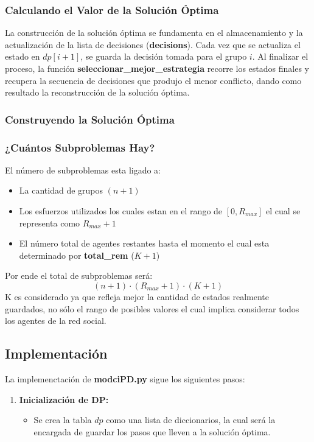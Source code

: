 \documentclass[11pt,letter]{article}
\begin{document}
\begin{itemize}
    \subsubsection{Calculando el Valor de la Solución Óptima}
    La construcción de la solución óptima se fundamenta en el almacenamiento y la actualización de la lista de decisiones (\textbf{decisions}). Cada vez que se actualiza el estado en $dp[i+1]$, se guarda la decisión tomada para el grupo $i$. Al finalizar el proceso, la función \textbf{seleccionar\_mejor\_estrategia} recorre los estados finales y recupera la secuencia de decisiones que produjo el menor conflicto, dando como resultado la reconstrucción de la solución óptima.
    \subsubsection{Construyendo la Solución Óptima}
    \subsubsection{¿Cuántos Subproblemas Hay?}
    El número de subproblemas esta ligado a:
    \begin{itemize}
    \item La cantidad de grupos $(n+1)$
    \item Los esfuerzos utilizados los cuales estan en el rango de $[0, R_{max}]$ el cual se representa como $R_{max}+1$
    \item El número total de agentes restantes hasta el momento el cual esta determinado por \textbf{total\_rem} ($K+1$)
\end{itemize}
Por ende el total de subproblemas será:
    \[
        (n+1)\cdot(R_{max}+1)\cdot(K+1)
    \]
K es considerado ya que refleja mejor la cantidad de estados realmente guardados, no sólo el rango de posibles valores el cual implica considerar todos los agentes de la red social.

    \subsection{Implementación}
    La implemenctación de \textbf{modciPD.py} sigue los siguientes pasos:
    \begin{enumerate}

    \item \textbf{Inicialización de DP:}
    \begin{itemize}
        \item Se crea la tabla $dp$ como una lista de diccionarios, la cual será la encargada de guardar los pasos que lleven a la solución óptima.


\end{itemize}
\end{enumerate}
\end{itemize}
\end{document}
